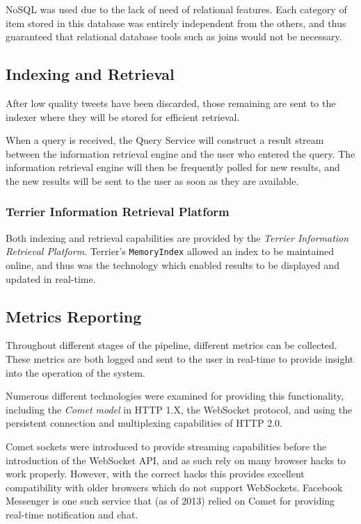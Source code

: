 \documentclass{l4proj}
\newcommand{\code}[1]{\texttt{#1}}
\begin{document}
         NoSQL was used due to the lack of need of relational features. Each category of item stored in this database was entirely independent from the others, and thus guaranteed that relational database tools such as joins would not be necessary.


        \subsection{Indexing and Retrieval}
        After low quality tweets have been discarded, those remaining are sent to the indexer where they will be stored for efficient retrieval. 
        
        When a query is received, the Query Service will construct a result stream between the information retrieval engine and the user who entered the query. The information retrieval engine will then be frequently polled for new results, and the new results will be sent to the user as soon as they are available.
        
            \subsubsection{Terrier Information Retrieval Platform}
            Both indexing and retrieval capabilities are provided by the \textit{Terrier Information Retrieval Platform}. Terrier's \code{MemoryIndex} allowed an index to be maintained online, and thus was the technology which enabled results to be displayed and updated in real-time.
       
        \subsection{Metrics Reporting}
        Throughout different stages of the pipeline, different metrics can be collected. These metrics are both logged and sent to the user in real-time to provide insight into the operation of the system.
        
        Numerous different technologies were examined for providing this functionality, including the \textit{Comet model} in HTTP 1.X, the WebSocket protocol, and using the persistent connection and multiplexing capabilities of HTTP 2.0.
        
        Comet sockets were introduced to provide streaming capabilities before the introduction of the WebSocket API, and as such rely on many browser hacks to work properly. However, with the correct hacks this provides excellent compatibility with older browsers which do not support WebSockets. Facebook Messenger is one such service that (as of 2013) relied on Comet for providing real-time notification and chat.
        
\end{document}
